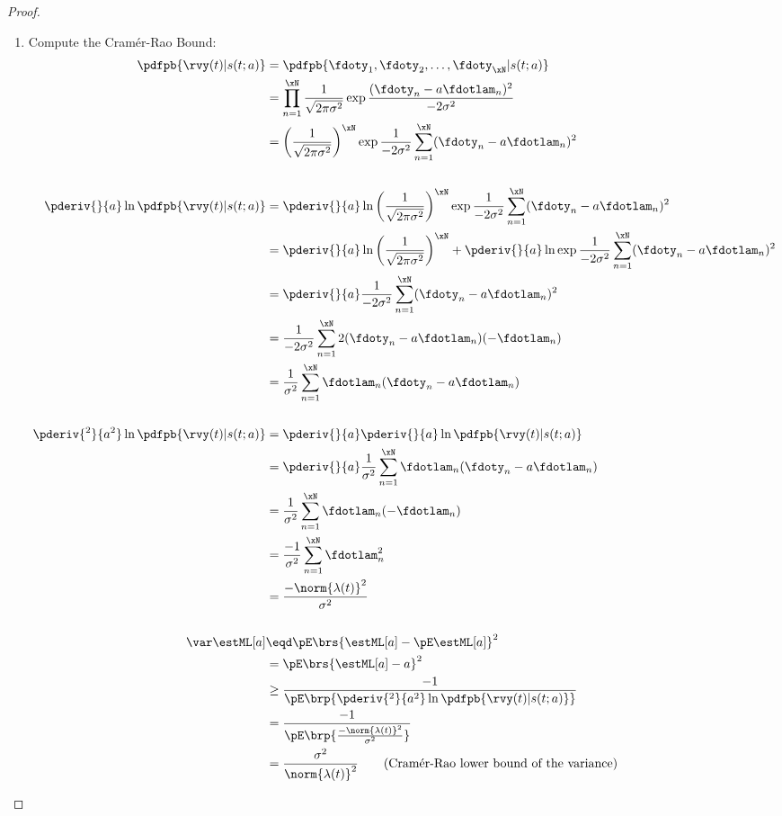 \begin{proof}
\begin{enumerate}
\item Compute the Cram\'er-Rao Bound:
\begin{align*}
   \pdfpb{\rvy(t)|s(t; a)}
     &=  \pdfpb{\fdoty_1, \fdoty_2,\ldots,\fdoty_{\xN}|s(t; a)}
   \\&=  \prod_{n=1}^\xN \frac{1}{\sqrt{2\pi\sigma^2}}
          \exp{\frac{(\fdoty_n- a\fdotlam_n)^2}{-2\sigma^2}}
   \\&=  \left(\frac{1}{\sqrt{2\pi\sigma^2}}\right)^\xN
          \exp{\frac{1}{-2\sigma^2} \sum_{n=1}^\xN (\fdoty_n- a\fdotlam_n)^2}
\\
\\
   \pderiv{}{a}\ln\pdfpb{\rvy(t)|s(t; a)}
     &=  \pderiv{}{a}\ln
          \left(\frac{1}{\sqrt{2\pi\sigma^2}}\right)^\xN
          \exp{\frac{1}{-2\sigma^2} \sum_{n=1}^\xN (\fdoty_n- a\fdotlam_n)^2}
   \\&=  \pderiv{}{a}\ln
          \left(\frac{1}{\sqrt{2\pi\sigma^2}}\right)^\xN
       +  \pderiv{}{a}\ln
          \exp{\frac{1}{-2\sigma^2} \sum_{n=1}^\xN (\fdoty_n- a\fdotlam_n)^2}
   \\&=  \pderiv{}{a}
          \frac{1}{-2\sigma^2} \sum_{n=1}^\xN (\fdoty_n- a\fdotlam_n)^2
   \\&=  \frac{1}{-2\sigma^2} \sum_{n=1}^\xN 2(\fdoty_n- a\fdotlam_n)(- \fdotlam_n)
   \\&=  \frac{1}{\sigma^2} \sum_{n=1}^\xN \fdotlam_n(\fdoty_n- a\fdotlam_n)
\\
\\
   \pderiv{^2}{a^2}\ln\pdfpb{\rvy(t)|s(t; a)}
     &=  \pderiv{}{a}\pderiv{}{a}\ln\pdfpb{\rvy(t)|s(t; a)}
   \\&=  \pderiv{}{a}
          \frac{1}{\sigma^2} \sum_{n=1}^\xN \fdotlam_n(\fdoty_n- a\fdotlam_n)
   \\&=  \frac{1}{\sigma^2} \sum_{n=1}^\xN \fdotlam_n(-\fdotlam_n)
   \\&=  \frac{-1}{\sigma^2} \sum_{n=1}^\xN \fdotlam_n^2
   \\&=  \frac{-\norm{\lambda(t)}^2}{\sigma^2}
\\
\\
   \var\estML[a]
     &\eqd \pE\brs{\estML[a]-\pE\estML[a]}^2
   \\&=    \pE\brs{\estML[a]- a}^2
   \\&\ge  \frac{-1}{\pE\brp{\pderiv{^2}{ a^2} \ln \pdfpb{\rvy(t)|s(t; a)}}}
   \\&=    \frac{-1}{\pE\brp{\frac{-\norm{\lambda(t)}^2}{\sigma^2}}}
   \\&=    \frac{\sigma^2}{\norm{\lambda(t)}^2}
     \qquad\text{(Cram\'er-Rao lower bound of the variance)}
\end{align*}


\end{enumerate}
\end{proof}
